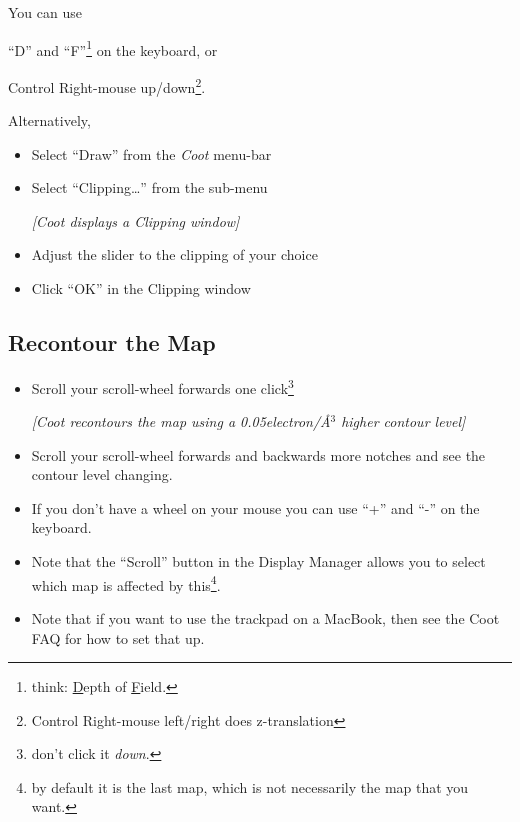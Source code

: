 \documentclass{article}
\begin{document}
You can use

\begin{trivlist}
\item ``D'' and ``F''\footnote{think:
    \underline{D}epth of \underline{F}ield.} on the keyboard, or
\item Control
Right-mouse up/down\footnote{Control Right-mouse left/right does z-translation}.
\end{trivlist}

Alternatively,
\begin{itemize}
\item Select \textsf{``Draw''} from the \emph{Coot} menu-bar
\item Select \textsf{``Clipping\ldots''} from the sub-menu

\textsl{ [\emph{Coot} displays a Clipping window]}

\item Adjust the slider to the clipping of your choice
\item Click \textsf{``OK''} in the Clipping window
\end{itemize}


\subsection{Recontour the Map}
\begin{itemize}
\item Scroll your scroll-wheel forwards one click\footnote{don't click
    it \emph{down}.}

 \textsl{ [\emph{Coot} recontours the map using a 0.05electron/\AA$^3$ higher
  contour level]}

\item Scroll your scroll-wheel forwards and backwards more notches and
  see the contour level changing.
  
\item If you don't have a wheel on your mouse you can use ``+'' and
  ``-'' on the keyboard.
  
\item Note that the \textsf{``Scroll''} button in the Display Manager
  allows you to select which map is affected by this\footnote{by
    default it is the last map, which is not necessarily the map that
    you want.}.

\item Note that if you want to use the trackpad on a MacBook, then see the
  Coot FAQ for how to set that up.

\end{itemize}
\end{document}

